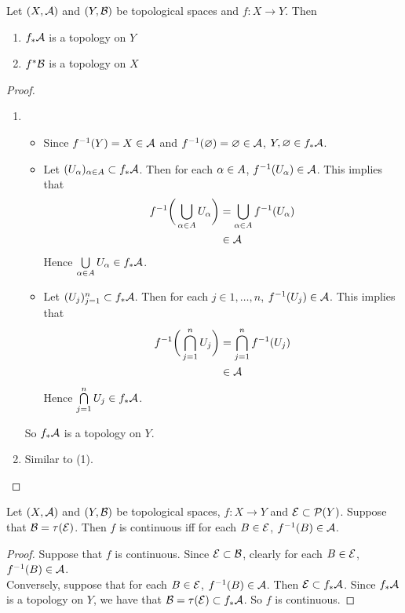 \documentclass{book}
\begin{document}
	\begin{ex} 
		Let $(X,\mathcal{A})$ and $(Y,\mathcal{B})$ be topological spaces and $f: X \rightarrow Y$. Then 
		\begin{enumerate}
			\item $f_*\mathcal{A}$ is a topology on $Y$
			\item $f^*\mathcal{B}$ is a topology on $X$
		\end{enumerate}
	\end{ex}
	
	\begin{proof}\
		\begin{enumerate}
			\item 
			\begin{itemize}
			\item Since $f^{-1}(Y) = X \in \mathcal{A}$ and $f^{-1}(\varnothing) = \varnothing \in \mathcal{A}$, $Y, \varnothing \in f_*\mathcal{A}$.
			\item Let $(U_{\alpha})_{\alpha \in A} \subset f_*\mathcal{A}$. Then for each $\alpha \in A$, $f^{-1}(U_{\alpha}) \in \mathcal{A}$. This implies that 
			\begin{align*}
			f^{-1}\bigg( \bigcup\limits_{\alpha \in A}U_{\alpha} \bigg) 
			&=  \bigcup\limits_{\alpha \in A} f^{-1}(U_{\alpha}) \\
			& \in \mathcal{A}
			\end{align*}
			Hence $\bigcup\limits_{\alpha \in A}U_{\alpha} \in f_*\mathcal{A}$.
			\item Let $(U_{j})_{j=1}^n \subset f_*\mathcal{A}$. Then for each $j \in {1, \ldots, n}$, $f^{-1}(U_{j}) \in \mathcal{A}$. This implies that 
			\begin{align*}
			f^{-1}\bigg( \bigcap\limits_{j=1}^n U_{j} \bigg) 
			&=  \bigcap\limits_{j=1}^n f^{-1}(U_{j}) \\
			& \in \mathcal{A}
			\end{align*}
			Hence $\bigcap\limits_{j=1}^n U_{j} \in f_*\mathcal{A}$.
			\end{itemize}
			So $f_*\mathcal{A}$ is a topology on $Y$.
			\item Similar to (1).
		\end{enumerate}
	\end{proof}	
	
	\begin{ex} 
	Let $(X,\mathcal{A})$ and $(Y,\mathcal{B})$ be topological spaces, $f:X \rightarrow Y$ and $\mathcal{E} \subset \mathcal{P}(Y)$. Suppose that $\mathcal{B} = \tau(\mathcal{E})$. Then $f$ is continuous iff for each $B \in \mathcal{E}$, $f^{-1}(B) \in \mathcal{A}$.
	\end{ex}
	
	\begin{proof}
	Suppose that $f$ is continuous. Since $\mathcal{E} \subset \mathcal{B}$, clearly for each $B \in \mathcal{E}$, $f^{-1}(B) \in \mathcal{A}$. \\
	Conversely, suppose that for each $B \in \mathcal{E}$, $f^{-1}(B) \in \mathcal{A}$. Then $\mathcal{E} \subset f_*\mathcal{A}$. Since $f_*\mathcal{A}$ is a topology on $Y$, we have that $\mathcal{B} = \tau(\mathcal{E}) \subset f_*\mathcal{A}$. So $f$ is continuous.
	\end{proof}
	
\end{document}
